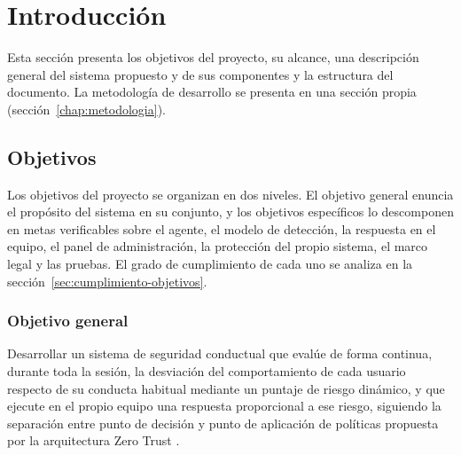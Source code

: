 \chapter{Introducción}

Esta sección presenta los objetivos del proyecto, su alcance, una descripción general del sistema propuesto y de sus componentes y la estructura del documento. La metodología de desarrollo se presenta en una sección propia (sección~\ref{chap:metodologia}).

\section{Objetivos}

Los objetivos del proyecto se organizan en dos niveles. El objetivo general enuncia el propósito del
sistema en su conjunto, y los objetivos específicos lo descomponen en metas verificables sobre el
agente, el modelo de detección, la respuesta en el equipo, el panel de administración, la protección
del propio sistema, el marco legal y las pruebas. El grado de cumplimiento de cada uno se analiza en
la sección~\ref{sec:cumplimiento-objetivos}.

\subsection{Objetivo general}
Desarrollar un sistema de seguridad conductual que evalúe de forma continua, durante toda la
sesión, la desviación del comportamiento de cada usuario respecto de su conducta habitual mediante
un puntaje de riesgo dinámico, y que ejecute en el propio equipo una respuesta proporcional a ese
riesgo, siguiendo la separación entre punto de decisión y punto de aplicación de políticas
propuesta por la arquitectura Zero Trust \parencite{Rose2020}.

